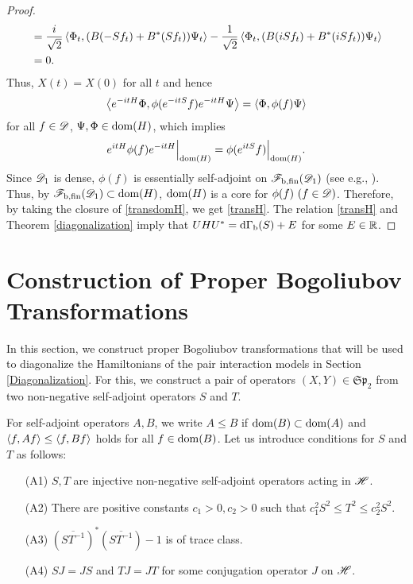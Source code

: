 \documentclass[12pt]{article}
\theoremstyle{plain}
\numberwithin{equation}{section}
\theoremstyle{remark}
\begin{document}
\begin{proof}
\begin{align*}
&= \frac{i}{\sqrt{2}}\left\langle\Phi_t,(B(-Sf_t) + B^*(Sf_t))\Psi_t\right\rangle
  -\frac{1}{\sqrt{2}}\left\langle\Phi_t,(B(iSf_t)+B^*(iSf_t))\Psi_t\right\rangle \\
&= 0.
\end{align*}
Thus, $X(t)=X(0)$ for all $t$ and hence
\begin{align*}
  \left\langle e^{-itH}\Phi,\phi(e^{-itS}f)e^{-itH}\Psi\right\rangle
  = \left\langle\Phi,\phi(f)\Psi\right\rangle
\end{align*}
for all $f\in\mathscr{D}$, $\Psi,\Phi\in\mathop{\mathrm{dom}}(H)$, which implies
\begin{align}
  e^{itH} \phi(f) e^{-itH} \Big|_{\mathop{\mathrm{dom}}(H)} = \phi(e^{itS}f) \Big|_{\mathop{\mathrm{dom}}(H)}. \label{transdomH}
\end{align}
Since $\mathscr{D}_1$ is dense, $\phi(f)$ is essentially self-adjoint on $\mathscr{F}_\mathrm{b,fin}(\mathscr{D}_1)$ (see e.g., \cite[Theorem 5.22]{A18}).
Thus, by $\mathscr{F}_\mathrm{b,fin}(\mathscr{D}_1)\subset \mathop{\mathrm{dom}}(H)$, $\mathop{\mathrm{dom}}(H)$ is a core for $\phi(f)~(f\in\mathscr{D})$.
Therefore, by taking the closure of \eqref{transdomH}, we get \eqref{transH}.
The relation \eqref{transH} and Theorem \ref{diagonalization} imply that 
$UHU^*=\mathrm{d\Gamma_b}(S)+E$ for some $E\in\mathbb{R}$.
\end{proof}







\section{Construction of Proper Bogoliubov Transformations}\label{construct}
In this section, we construct proper Bogoliubov transformations
that will be used to diagonalize the Hamiltonians of the pair interaction models in Section \ref{Diagonalization}.
For this, we construct a pair of operators $(X,Y) \in \mathfrak{Sp}_2$ from two non-negative self-adjoint operators $S$ and $T$.

For self-adjoint operators $A, B$, we write $A \leq B$ if $\mathop{\mathrm{dom}}(B) \subset \mathop{\mathrm{dom}}(A)$ and $\left\langle f,Af\right\rangle \leq \left\langle f,Bf\right\rangle$ holds for all $f \in \mathop{\mathrm{dom}}(B)$.
Let us introduce conditions for $S$ and $T$ as follows:
\begin{enumerate}
\item[(A1)] $S, T$ are injective non-negative self-adjoint operators acting in $\mathscr{H}$. 
\item[(A2)] There are positive constants $c_1>0, c_2>0$ such that $c_1^2 S^2\leq T^2 \leq c_2^2S^2$. 
\item[(A3)] $\left(\overline{ST^{-1}}\right)^*\left(\overline{ST^{-1}}\right)-1$ is of trace class.
\item[(A4)] $SJ=JS$ and $TJ=JT$ for some conjugation operator $J$ on $\mathscr{H}$.
\end{enumerate}
\end{document}
